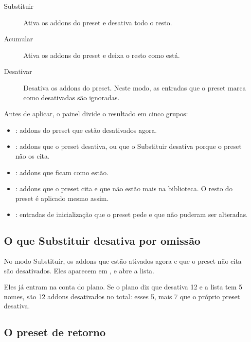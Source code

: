 \documentclass[11pt,a4paper]{article}
\begin{document}
\begin{description}
  \item[Substituir] Ativa os addons do preset e desativa todo o resto.
  \item[Acumular] Ativa os addons do preset e deixa o resto como está.
  \item[Desativar] Desativa os addons do preset. Neste modo, as entradas que o
    preset marca como desativadas são ignoradas.
\end{description}

Antes de aplicar, o painel  divide o resultado em cinco grupos:

\begin{itemize}
  \item {}: addons do preset que estão desativados agora.
  \item {}: addons que o preset desativa, ou que o Substituir
    desativa porque o preset não os cita.
  \item {}: addons que ficam como estão.
  \item {}: addons que o preset cita e que não
    estão mais na biblioteca. O resto do preset é aplicado mesmo assim.
  \item {}: entradas de inicialização que o preset
    pede e que não puderam ser alteradas.
\end{itemize}


\subsection{O que Substituir desativa por omissão}

No modo Substituir, os addons que estão ativados agora e que o preset não cita
são desativados. Eles aparecem em , e  abre a lista.

Eles já entram na conta do plano. Se o plano diz que desativa 12 e a lista tem 5
nomes, são 12 addons desativados no total: esses 5, mais 7 que o próprio preset
desativa.

\subsection{O preset de retorno}
\end{document}

